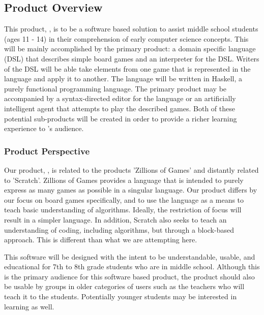 \documentclass[10pt,letter,draftclsnofoot,onecolumn]{IEEEtran}
\begin{document}
\begin{singlespace}
    \subsection{Product Overview}
         This product, \name, is to be a software based solution to assist middle school students (ages 11 - 14) in their comprehension of early computer science concepts. This will be mainly accomplished by the primary product: a domain specific language (DSL) that describes simple board games and an interpreter for the DSL. Writers of the DSL will be able take elements from one game that is represented in the language and apply it to another. The language will be written in Haskell, a purely functional programming language. The primary product may be accompanied by a syntax-directed editor for the language or an artificially intelligent agent that attempts to play the described games. Both of these potential sub-products will be created in order to provide a richer learning experience to \name's audience. 
    \subsubsection{Product Perspective}
        Our product, \name, is related to the products 'Zillions of Games' and distantly related to 'Scratch'\cite{scratch}. Zillions of Games provides a language that is intended to purely express as many games as possible in a singular language. Our product differs by our focus on board games specifically, and to use the language as a means to teach basic understanding of algorithms. Ideally, the restriction of focus will result in a simpler language. In addition, Scratch also seeks to teach an understanding of coding, including algorithms, but through a block-based approach. This is different than what we are attempting here.
        
        
        This software will be designed with the intent to be understandable, usable, and educational for 7th to 8th grade students who are in middle school. Although this is the primary audience for this software based product, the product should also be usable by groups in older categories of users such as the teachers who will teach it to the students. Potentially younger students may be interested in learning as well.
        

\end{singlespace}
\end{document}
